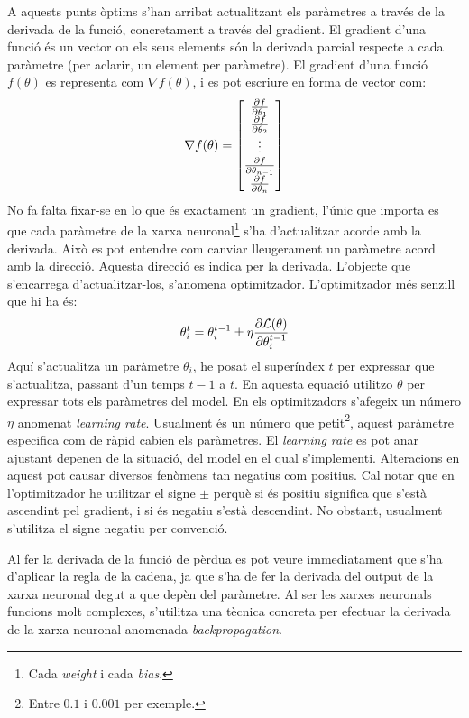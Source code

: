 A aquests punts òptims s'han arribat actualitzant els paràmetres a través de la derivada de la funció, concretament a través del gradient. El gradient d'una funció és un vector on els seus elements són la derivada parcial respecte a cada paràmetre (per aclarir, un element per paràmetre). El gradient d'una funció $f(\theta)$ es representa com $\nabla f(\theta)$, i es pot escriure en forma de vector com:
$$
\nabla f(\theta) = \begin{bmatrix}
	\pdv{f}{\theta_1} \\
	\pdv{f}{\theta_2} \\
	\vdots \\
	\pdv{f}{\theta_{n-1}} \\
	\pdv{f}{\theta_{n}}
\end{bmatrix}
$$
No fa falta fixar-se en lo que és exactament un gradient, l'únic que importa es que cada paràmetre de la xarxa neuronal\footnote{Cada \textit{weight} i cada \textit{bias}.} s'ha d'actualitzar acorde amb la derivada. Això es pot entendre com canviar lleugerament un paràmetre acord amb la direcció. Aquesta direcció es indica per la derivada. L'objecte que s'encarrega d'actualitzar-los, s'anomena optimitzador. L'optimitzador més senzill que hi ha és:
$$
\theta_{i}^t = \theta_{i}^{t-1} \pm \eta\pdv{\mathcal{L}(\theta)}{\theta_{i}^{t-1}}
$$
Aquí s'actualitza un paràmetre $\theta_i$, he posat el superíndex $t$ per expressar que s'actualitza, passant d'un temps $t-1$ a $t$. En aquesta equació utilitzo $\theta$ per expressar tots els paràmetres del model. En els optimitzadors s'afegeix un número $\eta$ anomenat \textit{learning rate}. Usualment és un número que petit\footnote{Entre $0.1$ i $0.001$ per exemple.}, aquest paràmetre especifica com de ràpid cabien els paràmetres. El \textit{learning rate} es pot anar ajustant depenen de la situació, del model en el qual s'implementi. Alteracions en aquest pot causar diversos fenòmens tan negatius com positius. Cal notar que en l'optimitzador he utilitzar el signe $\pm$ perquè si és positiu significa que s'està ascendint pel gradient, i si és negatiu s'està descendint. No obstant, usualment s'utilitza el signe negatiu per convenció. 

Al fer la derivada de la funció de pèrdua es pot veure immediatament que s'ha d'aplicar la regla de la cadena, ja que s'ha de fer la derivada del output de la xarxa neuronal degut a que depèn del paràmetre. Al ser les xarxes neuronals funcions molt complexes, s'utilitza una tècnica concreta per efectuar la derivada de la xarxa neuronal anomenada \textit{backpropagation}. 

